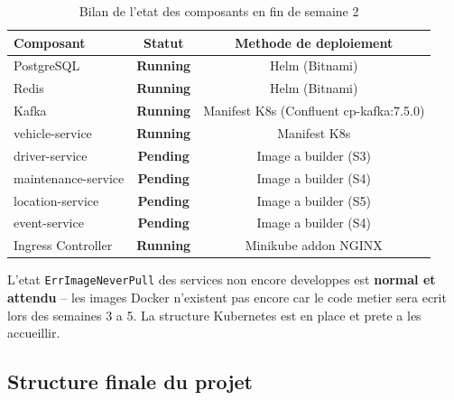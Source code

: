\documentclass[12pt,a4paper]{article}
\begin{document}
\begin{table}[H]
  \centering
  \begin{tabular}{lcc}
    \toprule
    \textbf{Composant} & \textbf{Statut} & \textbf{Methode de deploiement} \\
    \midrule
    PostgreSQL           & \textcolor{success}{\textbf{Running}} & Helm (Bitnami) \\
    Redis                & \textcolor{success}{\textbf{Running}} & Helm (Bitnami) \\
    Kafka  & \textcolor{success}{\textbf{Running}} & Manifest K8s (Confluent cp-kafka:7.5.0) \\
    vehicle-service      & \textcolor{success}{\textbf{Running}} & Manifest K8s \\
    driver-service       & \textcolor{warning}{\textbf{Pending}} & Image a builder (S3) \\
    maintenance-service  & \textcolor{warning}{\textbf{Pending}} & Image a builder (S4) \\
    location-service     & \textcolor{warning}{\textbf{Pending}} & Image a builder (S5) \\
    event-service        & \textcolor{warning}{\textbf{Pending}} & Image a builder (S4) \\
    Ingress Controller   & \textcolor{success}{\textbf{Running}} & Minikube addon NGINX \\
    \bottomrule
  \end{tabular}
  \caption{Bilan de l'etat des composants en fin de semaine 2}
\end{table}

\begin{infobox}
L'etat \texttt{ErrImageNeverPull} des services non encore developpes est
\textbf{normal et attendu} -- les images Docker n'existent pas encore car le code
metier sera ecrit lors des semaines 3 a 5. La structure Kubernetes est en place et
prete a les accueillir.
\end{infobox}

\subsection{Structure finale du projet}
\end{document}
